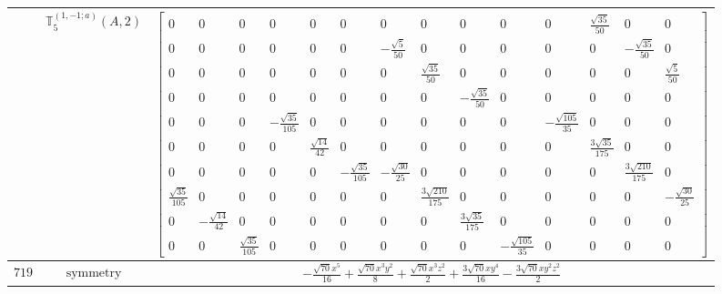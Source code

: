\documentclass[fleqn,8pt,landscape]{jsarticle}
\begin{document}
\begin{longtable}{ccc}
$  $ & $ \mathbb{T}_{5}^{(1,-1;a)}(A,2) $ & $ \begin{bmatrix} 0 & 0 & 0 & 0 & 0 & 0 & 0 & 0 & 0 & 0 & 0 & \frac{\sqrt{35}}{50} & 0 & 0 \\ 0 & 0 & 0 & 0 & 0 & 0 & - \frac{\sqrt{5}}{50} & 0 & 0 & 0 & 0 & 0 & - \frac{\sqrt{35}}{50} & 0 \\ 0 & 0 & 0 & 0 & 0 & 0 & 0 & \frac{\sqrt{35}}{50} & 0 & 0 & 0 & 0 & 0 & \frac{\sqrt{5}}{50} \\ 0 & 0 & 0 & 0 & 0 & 0 & 0 & 0 & - \frac{\sqrt{35}}{50} & 0 & 0 & 0 & 0 & 0 \\ 0 & 0 & 0 & - \frac{\sqrt{35}}{105} & 0 & 0 & 0 & 0 & 0 & 0 & - \frac{\sqrt{105}}{35} & 0 & 0 & 0 \\ 0 & 0 & 0 & 0 & \frac{\sqrt{14}}{42} & 0 & 0 & 0 & 0 & 0 & 0 & \frac{3 \sqrt{35}}{175} & 0 & 0 \\ 0 & 0 & 0 & 0 & 0 & - \frac{\sqrt{35}}{105} & - \frac{\sqrt{30}}{25} & 0 & 0 & 0 & 0 & 0 & \frac{3 \sqrt{210}}{175} & 0 \\ \frac{\sqrt{35}}{105} & 0 & 0 & 0 & 0 & 0 & 0 & \frac{3 \sqrt{210}}{175} & 0 & 0 & 0 & 0 & 0 & - \frac{\sqrt{30}}{25} \\ 0 & - \frac{\sqrt{14}}{42} & 0 & 0 & 0 & 0 & 0 & 0 & \frac{3 \sqrt{35}}{175} & 0 & 0 & 0 & 0 & 0 \\ 0 & 0 & \frac{\sqrt{35}}{105} & 0 & 0 & 0 & 0 & 0 & 0 & - \frac{\sqrt{105}}{35} & 0 & 0 & 0 & 0 \end{bmatrix} $ \\ \hline
$ 719 $ & $ \text{symmetry} $ & $ - \frac{\sqrt{70} x^{5}}{16} + \frac{\sqrt{70} x^{3} y^{2}}{8} + \frac{\sqrt{70} x^{3} z^{2}}{2} + \frac{3 \sqrt{70} x y^{4}}{16} - \frac{3 \sqrt{70} x y^{2} z^{2}}{2} $ \\

\end{longtable}
\end{document}
